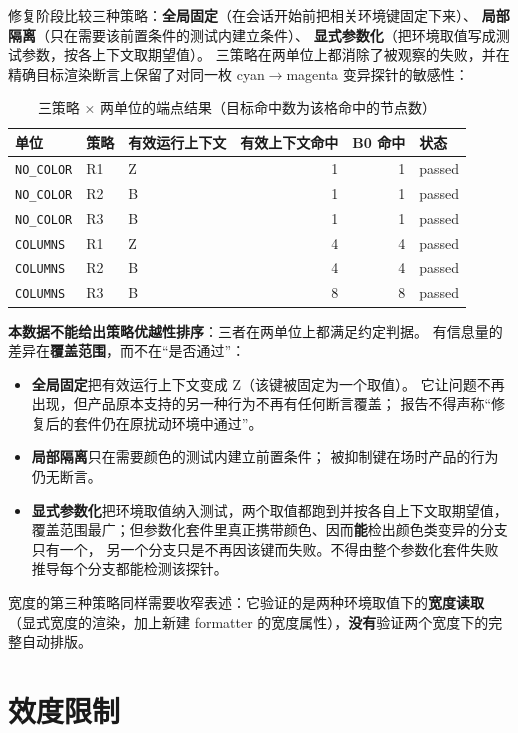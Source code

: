 \documentclass[11pt]{ctexart}
\begin{document}
修复阶段比较三种策略：\textbf{全局固定}（在会话开始前把相关环境键固定下来）、
\textbf{局部隔离}（只在需要该前置条件的测试内建立条件）、
\textbf{显式参数化}（把环境取值写成测试参数，按各上下文取期望值）。
三策略在两单位上都消除了被观察的失败，并在精确目标渲染断言上保留了对同一枚
cyan$\rightarrow$magenta 变异探针的敏感性：

\begin{table}[h]
\centering
\caption{三策略 × 两单位的端点结果（目标命中数为该格命中的节点数）}
\small
\begin{tabular}{lllrrl}
\toprule
单位 & 策略 & 有效运行上下文 & 有效上下文命中 & B0 命中 & 状态 \\
\midrule
\texttt{NO\_COLOR} & R1 & Z & 1 & 1 & passed \\
\texttt{NO\_COLOR} & R2 & B & 1 & 1 & passed \\
\texttt{NO\_COLOR} & R3 & B & 1 & 1 & passed \\
\texttt{COLUMNS} & R1 & Z & 4 & 4 & passed \\
\texttt{COLUMNS} & R2 & B & 4 & 4 & passed \\
\texttt{COLUMNS} & R3 & B & 8 & 8 & passed \\
\bottomrule
\end{tabular}
\end{table}

\textbf{本数据不能给出策略优越性排序}：三者在两单位上都满足约定判据。
有信息量的差异在\textbf{覆盖范围}，而不在“是否通过”：

\begin{itemize}
\item \textbf{全局固定}把有效运行上下文变成 Z（该键被固定为一个取值）。
它让问题不再出现，但产品原本支持的另一种行为不再有任何断言覆盖；
报告不得声称“修复后的套件仍在原扰动环境中通过”。
\item \textbf{局部隔离}只在需要颜色的测试内建立前置条件；
被抑制键在场时产品的行为仍无断言。
\item \textbf{显式参数化}把环境取值纳入测试，两个取值都跑到并按各自上下文取期望值，
覆盖范围最广；但参数化套件里真正携带颜色、因而\textbf{能}检出颜色类变异的分支只有一个，
另一个分支只是不再因该键而失败。不得由整个参数化套件失败推导每个分支都能检测该探针。
\end{itemize}

宽度的第三种策略同样需要收窄表述：它验证的是两种环境取值下的\textbf{宽度读取}
（显式宽度的渲染，加上新建 formatter 的宽度属性），\textbf{没有}验证两个宽度下的完整自动排版。

\section{效度限制}
\end{document}
